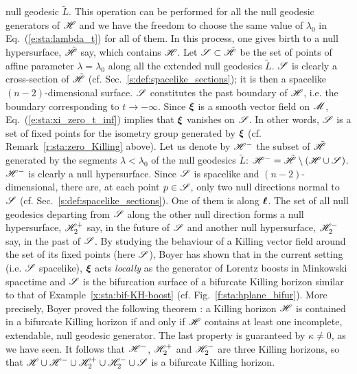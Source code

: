 null geodesic $\tilde L$. This operation can be performed for all the
null geodesic generators of $\mathscr{H}$ and we have the freedom to choose the same value
of $\lambda_0$ in Eq.~(\ref{e:sta:lambda_t}) for all of them. In this process,
one gives birth to a null hypersurface, $\tilde{\mathscr{H}}$ say, which contains $\mathscr{H}$. Let $\mathscr{S}\subset\tilde{\mathscr{H}}$ be the set of points of
affine parameter $\lambda=\lambda_0$ along all the extended null geodesics
$\tilde L$. $\mathscr{S}$ is clearly a cross-section of $\tilde{\mathscr{H}}$
(cf. Sec.~\ref{s:def:spacelike_sections}); it is then a
spacelike $(n-2)$-dimensional surface.
$\mathscr{S}$ constitutes the past boundary of $\mathscr{H}$, i.e. the boundary corresponding to $t\rightarrow -\infty$.
Since $\bm{\xi}$ is a smooth vector field on $\mathscr{M}$, Eq.~(\ref{e:sta:xi_zero_t_inf})
implies that $\bm{\xi}$ vanishes on $\mathscr{S}$.
In other words, $\mathscr{S}$ is a set of fixed points for the isometry group generated
by $\bm{\xi}$ (cf. Remark~\ref{r:sta:zero_Killing} above).
Let us denote by $\mathscr{H}^-$ the subset of $\tilde{\mathscr{H}}$
generated by the segments $\lambda<\lambda_0$ of the null geodesics $\tilde L$:
$\mathscr{H}^- = \tilde{\mathscr{H}}\setminus(\mathscr{H}\cup\mathscr{S})$.
$\mathscr{H}^-$ is clearly a null hypersurface.
Since $\mathscr{S}$ is spacelike and $(n-2)$-dimensional, there are, at each point
$p\in\mathscr{S}$, only two null directions normal to $\mathscr{S}$ (cf. Sec.~\ref{s:def:spacelike_sections}). One of them is along $\bm{\ell}$. The set of all null geodesics
departing from $\mathscr{S}$ along the other null direction forms a null hypersurface,
$\mathscr{H}_2^+$ say, in the future of $\mathscr{S}$ and another null hypersurface, $\mathscr{H}_2^-$
say, in the past of $\mathscr{S}$.
By studying the behaviour of a Killing vector field around the set of its
fixed points (here $\mathscr{S}$), Boyer \cite{Boyer69} has shown that in
the current setting (i.e. $\mathscr{S}$ spacelike), $\bm{\xi}$ acts \emph{locally}
as the generator of Lorentz boosts in Minkowski spacetime and $\mathscr{S}$ is the bifurcation surface
of a bifurcate Killing horizon similar to that of Example~\ref{x:sta:bif-KH-boost}
(cf. Fig.~\ref{f:sta:hplane_bifur}).
More precisely, Boyer proved the following theorem \cite{Boyer69}:
a Killing horizon $\mathscr{H}$ is contained in a bifurcate Killing horizon if and
only if $\mathscr{H}$ contains at least one incomplete, extendable, null geodesic
generator. The last property is guaranteed by $\kappa\not=0$, as we have seen.
It follows that $\mathscr{H}^-$, $\mathscr{H}_2^+$ and $\mathscr{H}_2^-$
are three Killing horizons, so that $\mathscr{H}\cup\mathscr{H}^-\cup\mathscr{H}_2^+\cup\mathscr{H}_2^-\cup\mathscr{S}$
is a bifurcate Killing horizon.

